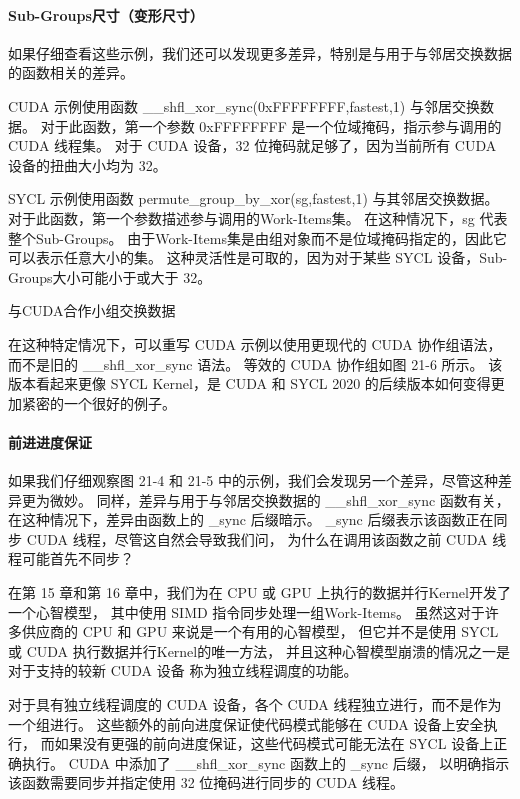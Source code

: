 \paragraph{Sub-Groups尺寸（变形尺寸）}

如果仔细查看这些示例，我们还可以发现更多差异，特别是与用于与邻居交换数据的函数相关的差异。

CUDA 示例使用函数 \_\_shfl\_xor\_sync(0xFFFFFFFF,fastest,1) 与邻居交换数据。 
对于此函数，第一个参数 0xFFFFFFFF 是一个位域掩码，指示参与调用的 CUDA 线程集。 
对于 CUDA 设备，32 位掩码就足够了，因为当前所有 CUDA 设备的扭曲大小均为 32。

SYCL 示例使用函数 permute\_group\_by\_xor(sg,fastest,1) 与其邻居交换数据。 
对于此函数，第一个参数描述参与调用的Work-Items集。 在这种情况下，sg 代表整个Sub-Groups。 
由于Work-Items集是由组对象而不是位域掩码指定的，因此它可以表示任意大小的集。 
这种灵活性是可取的，因为对于某些 SYCL 设备，Sub-Groups大小可能小于或大于 32。

{\color{red} 与CUDA合作小组交换数据}

在这种特定情况下，可以重写 CUDA 示例以使用更现代的 CUDA 协作组语法，
而不是旧的 \_\_shfl\_xor\_sync 语法。 等效的 CUDA 协作组如图 21-6 所示。 
该版本看起来更像 SYCL Kernel，是 CUDA 和 SYCL 2020 的后续版本如何变得更加紧密的一个很好的例子。

\paragraph{前进进度保证}

如果我们仔细观察图 21-4 和 21-5 中的示例，我们会发现另一个差异，尽管这种差异更为微妙。 
同样，差异与用于与邻居交换数据的 \_\_shfl\_xor\_sync 函数有关，
在这种情况下，差异由函数上的 \_sync 后缀暗示。 
\_sync 后缀表示该函数正在同步 CUDA 线程，尽管这自然会导致我们问，
为什么在调用该函数之前 CUDA 线程可能首先不同步？

在第 15 章和第 16 章中，我们为在 CPU 或 GPU 上执行的数据并行Kernel开发了一个心智模型，
其中使用 SIMD 指令同步处理一组Work-Items。 
虽然这对于许多供应商的 CPU 和 GPU 来说是一个有用的心智模型，
但它并不是使用 SYCL 或 CUDA 执行数据并行Kernel的唯一方法，
并且这种心智模型崩溃的情况之一是对于支持的较新 CUDA 设备 称为独立线程调度的功能。

对于具有独立线程调度的 CUDA 设备，各个 CUDA 线程独立进行，而不是作为一个组进行。 
这些额外的前向进度保证使代码模式能够在 CUDA 设备上安全执行，
而如果没有更强的前向进度保证，这些代码模式可能无法在 SYCL 设备上正确执行。 
CUDA 中添加了 \_\_shfl\_xor\_sync 函数上的 \_sync 后缀，
以明确指示该函数需要同步并指定使用 32 位掩码进行同步的 CUDA 线程。

